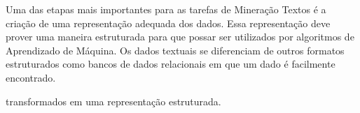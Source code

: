 
Uma das etapas mais importantes para as tarefas de Mineração Textos é a criação de uma representação adequada dos dados. Essa representação deve prover uma maneira estruturada para que possar ser utilizados por algoritmos de Aprendizado de Máquina. Os dados textuais se diferenciam de outros formatos estruturados como bancos de dados relacionais em que um dado é facilmente encontrado. 









transformados em uma representação estruturada.









































